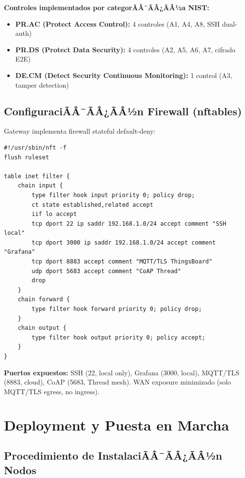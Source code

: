 \textbf{Controles implementados por categorÃÂ¯ÃÂ¿ÃÂ½a NIST:}

\begin{itemize}
    \item \textbf{PR.AC (Protect Access Control):} 4 controles (A1, A4, A8, SSH dual-auth)
    \item \textbf{PR.DS (Protect Data Security):} 4 controles (A2, A5, A6, A7, cifrado E2E)
    \item \textbf{DE.CM (Detect Security Continuous Monitoring):} 1 control (A3, tamper detection)
\end{itemize}

\subsection{ConfiguraciÃÂ¯ÃÂ¿ÃÂ½n Firewall (nftables)}
\label{sec:impl-firewall}

Gateway implementa firewall stateful default-deny:

\begin{verbatim}
#!/usr/sbin/nft -f
flush ruleset

table inet filter {
    chain input {
        type filter hook input priority 0; policy drop;
        ct state established,related accept
        iif lo accept
        tcp dport 22 ip saddr 192.168.1.0/24 accept comment "SSH local"
        tcp dport 3000 ip saddr 192.168.1.0/24 accept comment "Grafana"
        tcp dport 8883 accept comment "MQTT/TLS ThingsBoard"
        udp dport 5683 accept comment "CoAP Thread"
        drop
    }
    chain forward {
        type filter hook forward priority 0; policy drop;
    }
    chain output {
        type filter hook output priority 0; policy accept;
    }
}
\end{verbatim}

\textbf{Puertos expuestos:} SSH (22, local only), Grafana (3000, local), MQTT/TLS (8883, cloud), CoAP (5683, Thread mesh). WAN exposure minimizado (solo MQTT/TLS egress, no ingress).

\section{Deployment y Puesta en Marcha}
\label{sec:impl-deployment}

\subsection{Procedimiento de InstalaciÃÂ¯ÃÂ¿ÃÂ½n Nodos}

